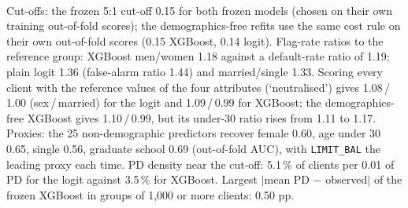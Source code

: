 \begin{table}[!htbp]
  \\[3pt]\begin{minipage}{\linewidth}\footnotesize Cut-offs: the frozen 5:1 cut-off 0.15 for both frozen models (chosen on their own training out-of-fold scores); the demographics-free refits use the same cost rule on their own out-of-fold scores (0.15 XGBoost, 0.14 logit). Flag-rate ratios to the reference group: XGBoost men/women 1.18 against a default-rate ratio of 1.19; plain logit 1.36 (false-alarm ratio 1.44) and married/single 1.33. Scoring every client with the reference values of the four attributes (`neutralised') gives 1.08\,/\,1.00 (sex\,/\,married) for the logit and 1.09\,/\,0.99 for XGBoost; the demographics-free XGBoost gives 1.10\,/\,0.99, but its under-30 ratio rises from 1.11 to 1.17. Proxies: the 25 non-demographic predictors recover female 0.60, age under 30 0.65, single 0.56, graduate school 0.69 (out-of-fold AUC), with \texttt{LIMIT\_\allowbreak{}BAL} the leading proxy each time. PD density near the cut-off: 5.1\,\% of clients per 0.01 of PD for the logit against 3.5\,\% for XGBoost. Largest $|$mean PD $-$ observed$|$ of the frozen XGBoost in groups of 1,000 or more clients: 0.50 pp.\end{minipage}
\end{table}

